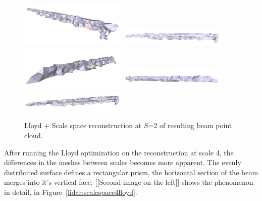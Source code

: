 \documentclass[12pt]{drexelthesis}
\begin{document}
\begin{figure}[!ht]
	\centering
		\includegraphics[width=2in]{real-lab-scans/meshed/optimized/scalespace2lloyd00.png}
		\includegraphics[width=2in]{real-lab-scans/meshed/optimized/scalespace2lloyd01.png}
		\includegraphics[width=2in]{real-lab-scans/meshed/optimized/scalespace2lloyd02.png}
		\includegraphics[width=2in]{real-lab-scans/meshed/optimized/scalespace2lloyd03.png}
		\includegraphics[width=2in]{real-lab-scans/meshed/optimized/scalespace2lloyd04.png}
		\caption[Lloyd + Scale space reconstruction at $S$=2 of segmented LiDAR data]{\centering Lloyd + Scale space reconstruction at $S$=2 of resulting beam point cloud.}
	\label{lidar:scalespace2lloyd}
\end{figure}

After running the Lloyd optimization on the reconstruction at scale 4, the differences in the meshes between scales becomes more apparent. The evenly distributed surface defines a rectangular prism, the horizontal section of the beam merges into it's vertical face. [[Second image on the left]] shows the phenomenon in detail, in Figure~\ref{lidar:scalespace4lloyd}.
\end{document}
